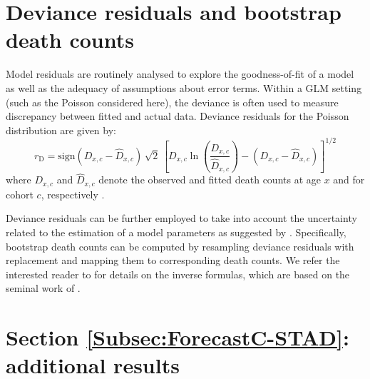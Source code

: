 \documentclass[11pt, a4paper]{article}
\begin{document}

\small
 

\appendix
{}
\normalsize

\section{Deviance residuals and bootstrap death counts}
\label{Appendix:ResidualDeath}     
Model residuals are routinely analysed to explore the goodness-of-fit of a model as well as the adequacy of assumptions about error terms. Within a GLM setting (such as the Poisson considered here), the deviance is often used to measure discrepancy between fitted and actual data. Deviance residuals for the Poisson distribution are given by: 
\begin{equation}\label{Eq:DevRes}
r_{\mathrm{D}}= \mathrm{sign} (D_{x,c}-\hat{D}_{x,c}) \, \sqrt{2} \, 
\left[D_{x,c} \ln \left(\frac{D_{x,c}}{\hat{D}_{x,c}}\right) - 
\left(D_{x,c}-\hat{D}_{x,c}\right)
\right]^{1/2}
\end{equation}
where $D_{x,c}$ and $\hat{D}_{x,c}$ denote the observed and fitted death counts at age $x$ and for cohort $c$, respectively \citep{mccullagh1989glm}. 

Deviance residuals can be further employed to take into account the uncertainty related to the estimation of a model parameters as suggested by \cite{koissi2006evaluating}. Specifically, bootstrap death counts can be computed by resampling deviance residuals with replacement and mapping them to corresponding death counts. We refer the interested reader to \cite{renshaw2008simulation} for details on the inverse formulas, which are based on the seminal work of \cite{efron1994introduction}.  

\section{Section \ref{Subsec:ForecastC-STAD}: additional results}
\label{Appendix:AdditResults}     

%
\end{document}
